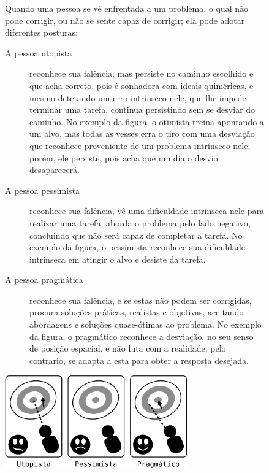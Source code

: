 \begin{figure}[!h]
\begin{elaboracion}[title=O utopista{,} o pessimista e o pragmático, width= 1.00\linewidth]
Quando uma pessoa se vê enfrentada a um problema, 
o qual não pode corrigir,
ou não se sente capaz de corrigir; ela pode adotar diferentes posturas:
\begin{description}
\item[A pessoa utopista] reconhece sua falência, mas persiste no caminho  escolhido
e que acha correto, pois é sonhadora com ideais quiméricas, 
e mesmo detetando um erro intrínseco nele, que lhe impede terminar uma tarefa,
continua persistindo sem se desviar do caminho.
No exemplo da figura, o otimista treina apontando a um alvo, 
mas todas as vesses erra o tiro com uma desviação que reconhece proveniente de um problema intrínseco nele;
porém, ele persiste, pois acha que um dia o desvio desaparecerá.
\item[A pessoa pessimista] reconhece sua falência, 
vê uma dificuldade intrínseca nele para realizar uma tarefa; aborda o problema pelo lado negativo,
concluindo que não será capaz de completar a tarefa.
No exemplo da figura, o pessimista reconhece sua dificuldade intrínseca em atingir o alvo
e desiste da tarefa. 
\item[A pessoa pragmática] reconhece sua falência, e se estas não podem ser corrigidas,
procura soluções práticas, realistas e objetivas, 
aceitando abordagens e soluções quase-ótimas ao problema.
No exemplo da figura, o pragmático reconhece a desviação,
 no seu senso de posição espacial, e não luta com a realidade; pelo contrario, se adapta a esta 
para obter a resposta desejada. 
\end{description}
\begin{center}
    \includegraphics[width=0.7\textwidth]{chapters/cap-body-control/problema-generico-completo.eps}
\end{center}
\end{elaboracion}
\end{figure}


